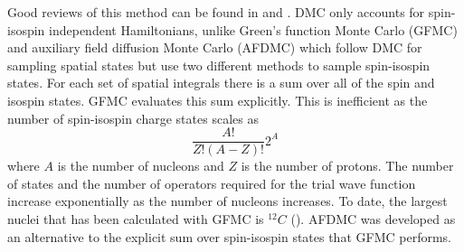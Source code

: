 Good reviews of this method can be found in \cite{foulkes2001} and  \cite{carlson2015}. DMC only accounts for spin-isospin independent Hamiltonians, unlike Green's function Monte Carlo (GFMC) and auxiliary field diffusion Monte Carlo (AFDMC) which follow DMC for sampling spatial states but use two different methods to sample spin-isospin states. For each set of spatial integrals there is a sum over all of the spin and isospin states. GFMC evaluates this sum explicitly. This is inefficient as the number of spin-isospin charge states scales as
\begin{equation}
   \frac{A!}{Z!(A-Z)!}2^A
\end{equation}
where $A$ is the number of nucleons and $Z$ is the number of protons.
The number of states and the number of operators required for the trial wave function increase exponentially as the number of nucleons increases. To date, the largest nuclei that has been calculated with GFMC is ${}^{12}C$ (\cite{lovato2013,lovato2014,lovato2015}). AFDMC was developed as an alternative to the explicit sum over spin-isospin states that GFMC performs.

